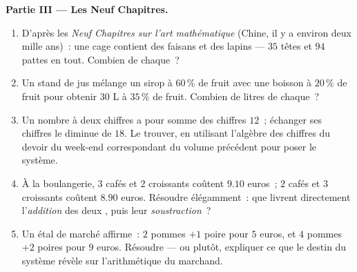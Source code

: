 \begin{problem}
\medskip
\noindent\textbf{Partie III --- Les Neuf Chapitres.}
\begin{enumerate}[resume]
  \item D'après les \emph{Neuf Chapitres sur l'art mathématique}
        (Chine, il y a environ deux mille ans)~: une cage contient
        des faisans et des lapins --- $35$ têtes et $94$ pattes en
        tout. Combien de chaque~?
  \item Un stand de jus mélange un sirop à $60\,\%$ de fruit avec
        une boisson à $20\,\%$ de fruit pour obtenir $30$ L à
        $35\,\%$ de fruit. Combien de litres de chaque~?
  \item Un nombre à deux chiffres a pour somme des chiffres $12$~;
        échanger ses chiffres le diminue de $18$. Le trouver, en
        utilisant l'algèbre des chiffres du devoir du week-end
        correspondant du volume précédent pour poser le système.
  \item À la boulangerie, $3$ cafés et $2$ croissants coûtent
        $9.10$ euros~; $2$ cafés et $3$ croissants coûtent $8.90$
        euros. Résoudre élégamment~: que livrent directement
        l'\emph{addition} des deux , puis leur
        \emph{soustraction}~?
  \item Un étal de marché affirme~: $2$ pommes $+ 1$ poire pour
        $5$ euros, et $4$ pommes $+ 2$ poires pour $9$ euros.
        Résoudre --- ou plutôt, expliquer ce que le destin du
        système révèle sur l'arithmétique du marchand.
\end{enumerate}


\end{problem}
